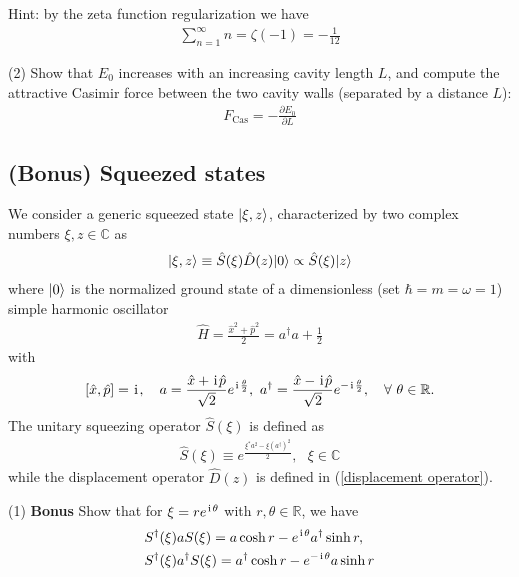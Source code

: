 Hint: by the zeta function regularization we have
\begin{align}
    \sum_{n=1}^\infty n=\zeta{(-1)}=-\frac1{12}
\end{align}

(2) Show that $E_0$ increases with an increasing cavity length $L$, and compute the attractive Casimir force between the two cavity walls (separated by a distance $L$): 
\begin{align}
    F_\text{Cas}=-\frac{\partial E_0}{\partial L}
\end{align}




\subsection{(Bonus) Squeezed states}

We consider a generic squeezed state $|{\xi,z}\rangle$, characterized by two complex numbers $\xi,z\in\mathbb{C}$ as
\begin{align}\label{squeezed state}
|{\xi,z}\rangle\equiv\hat S(\xi)\hat D(z)|{0}\rangle\propto\hat S(\xi)|{z}\rangle
\end{align}
where $|{0}\rangle$ is the normalized ground state of a dimensionless (set $\hbar=m=\omega=1$) simple harmonic oscillator
\begin{align}
\hat H=\frac{\hat x^2+\hat p^2}{2}=a^\dagger a+\frac12
\end{align}
with 
\begin{align}\label{SHO:dimensionless}
[\hat x,\hat p]=\hspace{1pt}\mathrm{i}\hspace{1pt},~~~a=\frac{\hat x+\hspace{1pt}\mathrm{i}\hspace{1pt}\hat p}{\sqrt2}e^{\hspace{1pt}\mathrm{i}\hspace{1pt}\frac\theta2},~a^\dagger=\frac{\hat x-\hspace{1pt}\mathrm{i}\hspace{1pt}\hat p}{\sqrt2}e^{-\hspace{1pt}\mathrm{i}\hspace{1pt}\frac\theta2},~~~\forall~\theta\in\mathbb{R}.
\end{align}
The unitary squeezing operator $\hat S(\xi)$ is defined as
\begin{align}\label{suqeezing operator}
\hat S(\xi)\equiv e^{\frac{\xi^\ast a^2-\xi(a^\dagger)^2}2},~~~\xi\in\mathbb{C}
\end{align}
while the displacement operator $\hat D(z)$ is defined in (\ref{displacement operator}).

(1) \textbf{ Bonus} Show that for $\xi=re^{\hspace{1pt}\mathrm{i}\hspace{1pt}\theta}$ with $r,\theta\in\mathbb{R}$, we have
\begin{align}
&S^\dagger(\xi)aS(\xi)=a\cosh{r}-e^{\hspace{1pt}\mathrm{i}\hspace{1pt}\theta}a^\dagger\sinh r,\\
&S^\dagger(\xi)a^\dagger S(\xi)=a^\dagger\cosh{r}-e^{-\hspace{1pt}\mathrm{i}\hspace{1pt}\theta}a\sinh r
\end{align}

